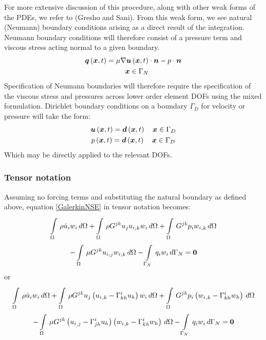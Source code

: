 For more extensive discussion of this procedure, along with other weak forms of the PDEs, we refer to (Gresho and Sani). From this weak form, we see natural (Neumann) boundary conditions arising as a direct result of the integration. Neumann boundary conditions will therefore consist of a pressure term and viscous stress acting normal to a given boundary. 
\begin{gather}
 \label{eqn:NSENeumannBC}  
   \fnof{\vect{q}}{\vect{x},t} = \mu\dotprod{\grad{\fnof{\vect{u}}{\vect{x},t}}}{\normal}-p\cdot{\normal}  \\
   \quad \vect{x}\in\Gamma_{N}
\end{gather}
Specification of Neumann boundaries will therefore require the specification of the viscous stress and pressures across lower order element DOFs using the mixed formulation. Dirichlet boundary conditions on a boundary $\Gamma_D$ for velocity or pressure will take the form:
\begin{gather}
 \label{eqn:NSEDirichletBC} 
  \fnof{\vect{u}}{\vect{x},t} = \fnof{\vect{d}}{\vect{x},t} \quad \vect{x}\in\Gamma_{D}\\
  \fnof{p}{\vect{x},t} = \fnof{\vect{d}}{\vect{x},t} \quad \vect{x}\in\Gamma_{D}
\end{gather}
Which may be directly applied to the relevant DOFs.

\subsubsection{Tensor notation}
Assuming no forcing terms and substituting the natural boundary as defined above, equation \eqref{GalerkinNSE} in tensor notation becomes:
\begin{multline}
 \label{TensorNSE}
  \gint{\Omega}{}{\rho\dot{u}_{i}w_{i}}{\Omega}
 +\gint{\Omega}{}{{\rho}G^{jk}u_{j}\covarderiv{u_{i}}{k}w_{i}}{\Omega}
 +\gint{\Omega}{}{G^{jk}{p_{i}}\covarderiv{w_{i}}{k}}{\Omega}\\
 -\gint{\Omega}{}{{\mu}G^{jk}\covarderiv{u_{i}}{j}\covarderiv{w_{i}}{k}}{\Omega}
 -\gint{\Gamma_N}{}{{q_{i}}{w_i}}{\Gamma_N}=\vect{0}
\end{multline}
or
\begin{multline}
 \label{Tensor2NSE}
  \gint{\Omega}{}{\rho\dot{u}_{i}w_{i}}{\Omega}
 +\gint{\Omega}{}{{\rho}G^{jk}{u_j}\pbrac{\partialderiv{u_{i}}{k}-\christoffel{i}{k}{h}u_h}{w_{i}}}{\Omega}
 +\gint{\Omega}{}{G^{jk}{p_{i}}\pbrac{\partialderiv{w_{i}}{k}-\christoffel{i}{k}{h}w_h}}{\Omega}\\
 -\gint{\Omega}{}{{\mu}G^{jk}\pbrac{\partialderiv{u_{i}}{j}-\christoffel{i}{j}{h}u_h}\pbrac{\partialderiv{w_{i}}{k}-\christoffel{i}{k}{h}w_h}}{\Omega}
 -\gint{\Gamma_N}{}{{q_{i}}{w_i}}{\Gamma_N}=\vect{0}
\end{multline}


